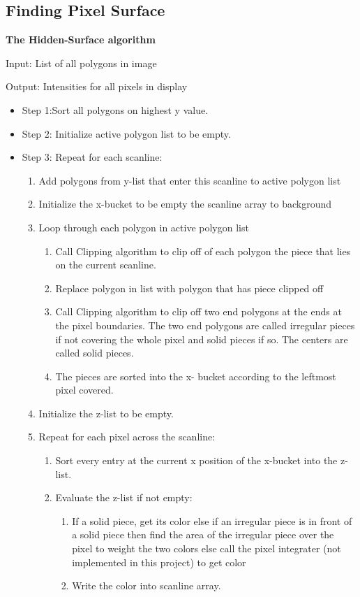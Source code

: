 \documentclass{acmsiggraph}               %
\begin{document}
\subsection{Finding Pixel Surface}
\label{sec:Finding Pixel Surface}


\par \textbf{ The Hidden-Surface algorithm} \cite{0}
\par Input: List of all polygons in image
\par Output: Intensities for all pixels in display

\begin{itemize}
\item Step 1:Sort all polygons on highest y value. 
\item Step 2: Initialize active polygon list to be empty. 
\item Step 3: Repeat for each scanline: 
\begin{enumerate}
\item	Add polygons from y-list that enter this scanline to active polygon list
\item	Initialize the x-bucket to be empty the scanline array to background
\item   Loop through each polygon in active polygon list 
\begin{enumerate}
\item  Call Clipping algorithm to clip off of each polygon the piece that lies on the current scanline. 
\item  Replace polygon in list with polygon that has piece clipped off
\item Call Clipping algorithm to clip off two end polygons at the ends at the pixel boundaries. The two end polygons are called irregular pieces if not covering the whole pixel and solid pieces if so. The centers are called solid pieces.
\item  The pieces are sorted into the x- bucket according to the leftmost pixel covered. 
\end{enumerate}
\item  Initialize the z-list to be empty. 
\item  Repeat for each pixel across the scanline:
\begin{enumerate}
\item  Sort every entry at the current x position of the x-bucket into the z- list. 
\item   Evaluate the z-list if not empty: 
\begin{enumerate}
\item   If a solid piece, get its color else if an irregular piece is in front of a solid piece then find the area of the irregular piece over the pixel to weight the two colors else call the pixel integrater (not implemented in this project) to get color
\item   Write the color into scanline array. 
\end{enumerate}
\end{enumerate}
\end{enumerate}
\end{itemize}
\end{document}
